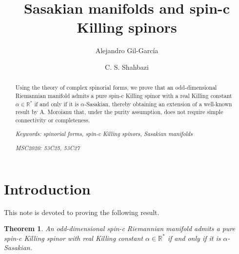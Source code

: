 \documentclass[10pt,a4paper,twoside,reqno]{amsart}
\theoremstyle{plain}
\newtheorem{thm}{Theorem}[section]
\theoremstyle{definition}
\theoremstyle{remark}
\begin{document}
\title[Sasakian manifolds and spin-c Killing spinors]{Sasakian manifolds and spin-c Killing spinors}

\author[Alejandro Gil-García]{Alejandro Gil-García }
\address{Scuola Internazionale Superiore di Studi Avanzati, Trieste, Italy}

\author[C. S. Shahbazi]{C. S. Shahbazi }
\address{Departamento de Matem\'aticas, Universidad UNED - Madrid, Reino de Espa\~na}

\begin{abstract}
Using the theory of complex spinorial forms, we prove that an odd-dimensional Riemannian manifold admits a pure spin-c Killing spinor with a real Killing constant $\alpha \in \mathbb{R}^{\ast}$ if and only if it is $\alpha$-Sasakian, thereby obtaining an extension of a well-known result by A. Moroianu that, under the purity assumption, does not require simple connectivity or completeness.\bigskip

\noindent
\emph{Keywords: spinorial forms, spin-c Killing spinors, Sasakian manifolds}\medskip

\noindent
\emph{MSC2020: 53C25, 53C27}

\end{abstract}
 
\maketitle




\section{Introduction}


This note is devoted to proving the following result.

\begin{thm}
\label{thm:maintheorem}
An odd-dimensional spin-c Riemannian manifold admits a pure spin-c Killing spinor with real Killing constant $\alpha \in \mathbb{R}^{\ast}$ if and only if it is $\alpha$-Sasakian.
\end{thm}
\end{document}
